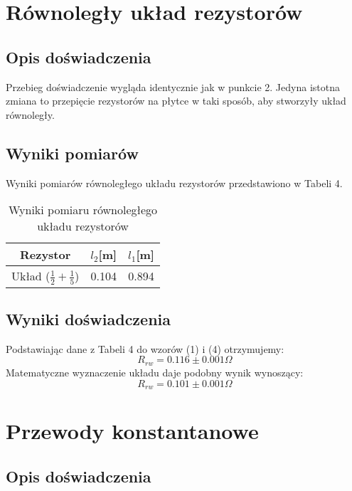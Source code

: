 \documentclass{article} %
\begin{document}
\section{Równoległy układ rezystorów}


\subsection{Opis doświadczenia}

Przebieg doświadczenie wygląda identycznie jak w punkcie 2. Jedyna istotna zmiana to przepięcie rezystorów na płytce w taki sposób, aby stworzyły układ równoległy.

\subsection{Wyniki pomiarów}

Wyniki pomiarów równoległego układu rezystorów przedstawiono w Tabeli 4.

\begin{table}[h!]
\centering
\begin{tabular}{|c|c|c|}
\hline
\textbf{Rezystor} & \textbf{$l_2$[m]} & \textbf{$l_1$[m]} \\
\hline
 Układ ($\frac{1}{2}+\frac{1}{5}$) & 0.104 & 0.894 \\
\hline
\end{tabular}
\caption{Wyniki pomiaru równoległego układu rezystorów}
\label{table:students}
\end{table}

\subsection{Wyniki doświadczenia}
Podstawiając dane z Tabeli 4 do wzorów (1) i (4) otrzymujemy:
{\large
\begin{equation}
    R_{rw} = 0.116\pm0.001\Omega
\end{equation}
}
Matematyczne wyznaczenie układu daje podobny wynik wynoszący:
{\large
\begin{equation}
    R_{rw} = 0.101\pm0.001\Omega
\end{equation}
}
\section{Przewody konstantanowe}

\subsection{Opis doświadczenia}
\end{document}
